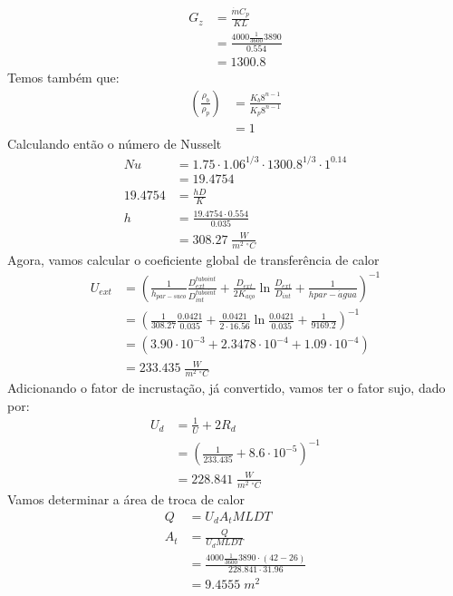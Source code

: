 \begin{align}
    G_{z} &= \frac{\dot{m}C_{p} }{KL}\\
    &=\frac{4000 \frac{1}{3600} 3890}{0.554}\\
    &= 1300.8
\end{align}
Temos também que:
\begin{align}
    \left( \frac{\rho _{b} }{\rho _{p} } \right) &= \frac{K_{b} 8^{n-1} }{K_{p} 8^{n-1} }\\
    &= 1
\end{align}
Calculando então o número de Nusselt
\begin{align}
    Nu &= 1.75 \cdot 1.06^{1/3} \cdot 1300.8^{1/3} \cdot 1^{0.14}\\
    &= 19.4754\\
    19.4754 &= \frac{hD}{K} \\
    h &= \frac{19.4754 \cdot 0.554}{0.035}\\
    &= 308.27 \; \frac{W}{m^{2} \; ^{\circ}C}
\end{align}
Agora, vamos calcular o coeficiente global de transferência de calor
\begin{align}
    U_{ext} &= \left( \frac{1}{h_{par-suco} }\frac{D_{ext}^{tubo int}}{D_{int}^{tubo int} } + \frac{D_{ext}}{2K_{a\textit{\c{c}}o }}\ln \frac{D_{ext}}{D_{int}} + \frac{1}{h{par-\acute{a}gua}}  \right)^{-1}\\
    &= \left( \frac{1}{308.27} \frac{0.0421}{0.035} + \frac{0.0421}{2 \cdot 16.56} \ln \frac{0.0421}{0.035} + \frac{1}{9169.2}  \right)^{-1}\\
    &= \left( 3.90 \cdot 10^{-3} + 2.3478 \cdot 10^{-4} + 1.09 \cdot 10^{-4}  \right)\\
    &= 233.435 \; \frac{W}{m^{2} \; ^{\circ}C}
\end{align}
Adicionando o fator de incrustação, já convertido, vamos ter o fator sujo, dado por:
\begin{align}
    U_{d} &= \frac{1}{U} + 2R_{d}\\
    &= \left(\frac{1}{233.435} + 8.6\cdot 10^{-5}\right)^{-1} \\
    &= 228.841 \; \frac{W}{m^{2} \; ^{\circ}C}
\end{align}
Vamos determinar a área de troca de calor
\begin{align}
    Q &= U_{d}A_{t} MLDT\\
    A_{t} &= \frac{Q}{U_{d}MLDT}\\
    &= \frac{4000 \frac{1}{3600} 3890 \cdot (42-26)}{228.841 \cdot 31.96}\\
    &= 9.4555 \; m^{2}
\end{align}
